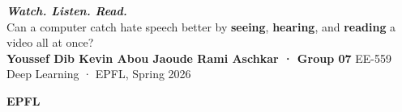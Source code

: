 

\newcommand{\clabel}[1]{\textcolor{epflred}{\textbf{#1}}}
\newcommand{\vtag}{\colorbox{videobg}  {\large\bfseries\textcolor{blue!80!black}{see}}}
\newcommand{\atag}{\colorbox{audiobg}  {\large\bfseries\textcolor{green!60!black}{hear}}}
\newcommand{\ttag}{\colorbox{textpurbg}{\large\bfseries\textcolor{purple!80!black}{read}}}



\noindent\colorbox{epflred}{\makebox[\dimexpr\textwidth][l]{\hfill}}%
\vspace{-2mm}

\noindent
\begin{minipage}[b]{0.80\textwidth}
  {\VERYHuge\bfseries\itshape Watch.\;
   \textcolor{epflred}{Listen.}\; Read.}\\[3mm]
  {\LARGE Can a computer catch hate speech better by
   \textbf{seeing}, \textbf{hearing}, and \textbf{reading}
   a video all at once?}\\[4mm]
  {\Large\bfseries Youssef Dib \quad Kevin Abou Jaoude \quad Rami Aschkar
   \quad \textcolor{epflred}{· Group 07}}
  \hfill
  {\large\color{gray} EE-559 Deep Learning · EPFL, Spring 2026}
\end{minipage}%
\hfill
\begin{minipage}[b]{0.18\textwidth}
  \raggedleft
  {\VeryHuge\bfseries\textcolor{epflred}{EPFL}}
\end{minipage}

\vspace{3mm}
\noindent{\color{epflred}\rule{\textwidth}{2.5pt}}
\vspace{2mm}


